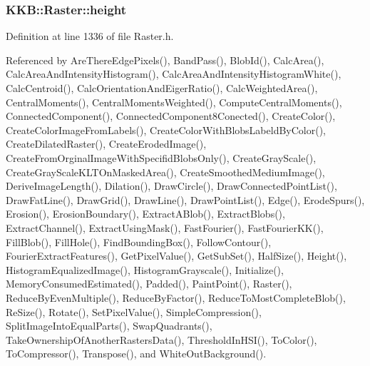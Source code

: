 \subsubsection[{\texorpdfstring{height}{height}}]{ K\+K\+B\+::\+Raster\+::height\hspace{0.3cm}{\ttfamily [protected]}}\hypertarget{class_k_k_b_1_1_raster_af39ff189de4fbb6de98392e187efafb7}{}\label{class_k_k_b_1_1_raster_af39ff189de4fbb6de98392e187efafb7}


Definition at line 1336 of file Raster.\+h.



Referenced by Are\+There\+Edge\+Pixels(), Band\+Pass(), Blob\+Id(), Calc\+Area(), Calc\+Area\+And\+Intensity\+Histogram(), Calc\+Area\+And\+Intensity\+Histogram\+White(), Calc\+Centroid(), Calc\+Orientation\+And\+Eiger\+Ratio(), Calc\+Weighted\+Area(), Central\+Moments(), Central\+Moments\+Weighted(), Compute\+Central\+Moments(), Connected\+Component(), Connected\+Component8\+Conected(), Create\+Color(), Create\+Color\+Image\+From\+Labels(), Create\+Color\+With\+Blobs\+Labeld\+By\+Color(), Create\+Dilated\+Raster(), Create\+Eroded\+Image(), Create\+From\+Orginal\+Image\+With\+Specifid\+Blobs\+Only(), Create\+Gray\+Scale(), Create\+Gray\+Scale\+K\+L\+T\+On\+Masked\+Area(), Create\+Smoothed\+Medium\+Image(), Derive\+Image\+Length(), Dilation(), Draw\+Circle(), Draw\+Connected\+Point\+List(), Draw\+Fat\+Line(), Draw\+Grid(), Draw\+Line(), Draw\+Point\+List(), Edge(), Erode\+Spurs(), Erosion(), Erosion\+Boundary(), Extract\+A\+Blob(), Extract\+Blobs(), Extract\+Channel(), Extract\+Using\+Mask(), Fast\+Fourier(), Fast\+Fourier\+K\+K(), Fill\+Blob(), Fill\+Hole(), Find\+Bounding\+Box(), Follow\+Contour(), Fourier\+Extract\+Features(), Get\+Pixel\+Value(), Get\+Sub\+Set(), Half\+Size(), Height(), Histogram\+Equalized\+Image(), Histogram\+Grayscale(), Initialize(), Memory\+Consumed\+Estimated(), Padded(), Paint\+Point(), Raster(), Reduce\+By\+Even\+Multiple(), Reduce\+By\+Factor(), Reduce\+To\+Most\+Complete\+Blob(), Re\+Size(), Rotate(), Set\+Pixel\+Value(), Simple\+Compression(), Split\+Image\+Into\+Equal\+Parts(), Swap\+Quadrants(), Take\+Ownership\+Of\+Another\+Rasters\+Data(), Threshold\+In\+H\+S\+I(), To\+Color(), To\+Compressor(), Transpose(), and White\+Out\+Background().

